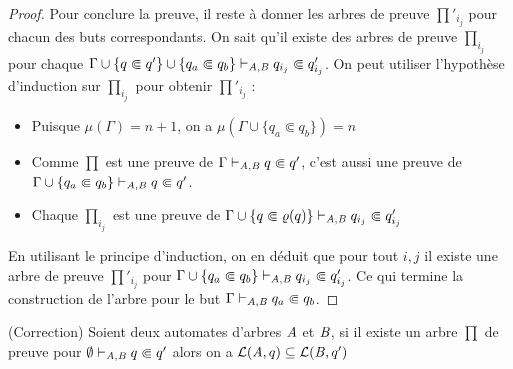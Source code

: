 \begin{proof}
  Pour conclure la preuve, il reste à donner les arbres de preuve 
  $\prod'_{i_j}$ pour chacun des buts correspondants.
  On sait qu'il existe des arbres de preuve 
  $\prod_{i_j}$ pour chaque $\Gamma \cup \{q \Subset q'\} \cup
  \{q_a \Subset q_b\} \vdash_{\mathit A, \mathit B} q_{i_j} \Subset q'_{i_j}$.  On peut
  utiliser l'hypothèse d'induction sur $\prod_{i_j}$ pour obtenir 
  $\prod'_{i_j}$ :
  \begin{itemize}
    
  \item Puisque $\mu(\Gamma) = n + 1$, on a $\mu(\Gamma\cup \{q_a \Subset q_b\}) = n$
      

  \item Comme  $\prod$ est une preuve de $\Gamma \vdash_{\mathit A, \mathit B} q \Subset q'$, c'est aussi une preuve de 
    $\Gamma \cup \{q_a \Subset q_b\}\vdash_{\mathit A, \mathit B} q \Subset q'$.
      
  \item Chaque $\prod_{i_j}$ est une preuve de $\Gamma \cup \{q \Subset \varrho(q)\} \vdash_{\mathit A, \mathit B}  q_{i_j} \Subset q'_{i_j}$
  \end{itemize}
    
  \noindent
  En utilisant le principe  d'induction, on en déduit que pour tout $i,j$ il existe
  une arbre de preuve $\prod'_{i_j}$ pour $\Gamma \cup \{q_a \Subset q_b\} \vdash_{\mathit A, \mathit B} q_{i_j}
  \Subset q'_{i_j}$.  Ce qui termine la construction de l'arbre pour le but  $\Gamma \vdash_{\mathit A,
    \mathit B} q_a \Subset q_b$.
\end{proof}
  
\begin{theorem}{(Correction)}
  \label{thm:soundness}
  Soient deux automates d'arbres $\mathit A$ et $\mathit B$, si il existe un arbre $\prod$ de preuve
  pour $\emptyset \vdash_{\mathit A, \mathit B} q \Subset q'$ alors on a $\mathcal{L}(\mathit A, q) \subseteq \mathcal{L}(\mathit B, q')$
\end{theorem}
  
